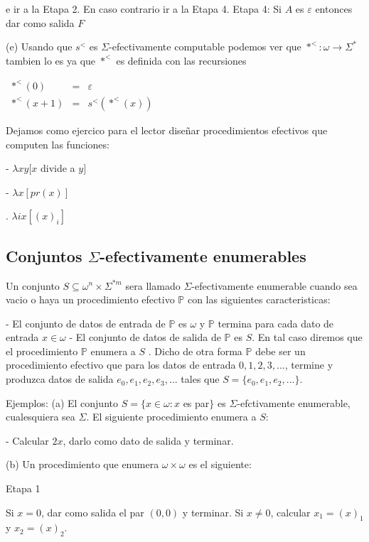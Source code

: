 e ir a la Etapa 2. En caso contrario ir a la Etapa 4.
Etapa 4: Si \(A\) es \(\varepsilon \) entonces dar como salida \(F\)

(e) Usando que \(s^{< }\) es \(\Sigma \)-efectivamente computable podemos ver que \(\ast ^{< }:\omega \rightarrow \Sigma ^{\ast }\) tambien lo es ya que \(\ast ^{< }\) es definida con las recursiones

\(\displaystyle \begin{array}{rcl} \ast ^{< }(0) & =& \varepsilon \\ \ast ^{< }(x+1) & =& s^{< }(\ast ^{< }(x)) \end{array} \)

Dejamos como ejercico para el lector dise\~{n}ar procedimientos efectivos que computen las funciones:

- \(\lambda xy[x\) divide a \(y]\)

- \(\lambda x[pr(x)]\)

. \(\lambda ix[(x)_{i}]\)

\subsection{Conjuntos \(\Sigma \)-efectivamente enumerables}

Un conjunto \(S\subseteq \omega ^{n}\times \Sigma ^{\ast m}\) sera llamado \(\Sigma \)-efectivamente enumerable cuando sea vacio o haya un procedimiento efectivo \(\mathbb{P}\) con las siguientes caracteristicas:

- El conjunto de datos de entrada de \(\mathbb{P}\) es \(\omega \) y \( \mathbb{P}\) termina para cada dato de entrada \(x\in \omega \)
- El conjunto de datos de salida de \(\mathbb{P}\) es \(S\).
En tal caso diremos que el procedimiento \(\mathbb{P}\) enumera a \(S\) . Dicho de otra forma \(\mathbb{P}\) debe ser un procedimiento efectivo que para los datos de entrada \(0,1,2,3,...\), termine y produzca datos de salida \( e_{0},e_{1},e_{2},e_{3},...\) tales que \(S=\{e_{0},e_{1},e_{2},...\}\).

Ejemplos: (a) El conjunto \(S=\{x\in \omega :x\) es par\(\}\) es \( \Sigma \)-efctivamente enumerable, cualesquiera sea \(\Sigma \). El siguiente procedimiento enumera a \(S\):

- Calcular \(2x\), darlo como dato de salida y terminar.

(b) Un procedimiento que enumera \(\omega \times \omega \) es el siguiente:

Etapa 1

Si \(x=0\), dar como salida el par \((0,0)\) y terminar. Si \(x\neq 0\), calcular \( x_{1}=(x)_{1}\) y \(x_{2}=(x)_{2}\).


